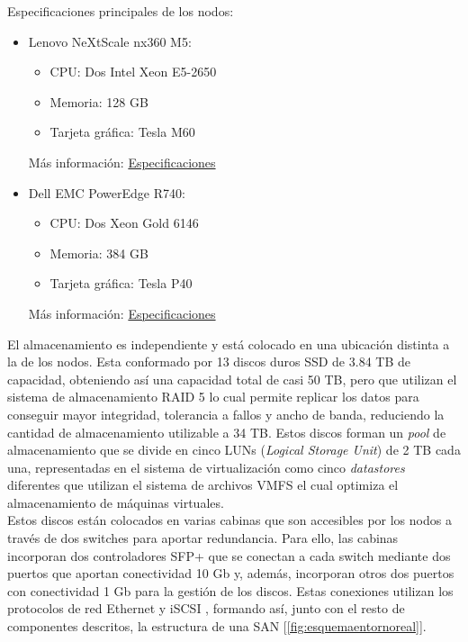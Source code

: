 Especificaciones principales de los nodos:
\begin{itemize}
    \item Lenovo NeXtScale nx360 M5: 
        \begin{itemize}
            \item CPU: Dos Intel Xeon E5-2650
            \item Memoria: 128 GB
            \item Tarjeta  gráfica: Tesla M60
        \end{itemize}
            Más información: \href{https://lenovopress.com/tips1195-nextscale-nx360-m5-e5-2600-v3}{Especificaciones}
    \item Dell EMC PowerEdge R740:
        \begin{itemize}
            \item CPU: Dos Xeon Gold 6146
            \item Memoria: 384 GB
            \item Tarjeta gráfica: Tesla P40
        \end{itemize}
    Más información: \href{https://www.dell.com/es-es/work/shop/servidores-almacenamiento-y-redes/smart-value-poweredge-r740-server-standard/spd/poweredge-r740/per7400m}{Especificaciones}
\end{itemize}
El almacenamiento es independiente y está colocado en una ubicación distinta a la de los nodos. Esta conformado por 13 discos duros SSD de 3.84 TB de capacidad, obteniendo así una capacidad total de casi 50 TB, pero que utilizan el sistema de almacenamiento RAID 5 lo cual permite replicar los datos para conseguir mayor  integridad, tolerancia a fallos y ancho de banda, reduciendo la cantidad de almacenamiento utilizable a 34 TB. Estos discos forman un \textit{pool} de almacenamiento que se divide en cinco LUNs (\textit{Logical Storage Unit}) de 2 TB cada una, representadas en el sistema de virtualización como cinco \textit{datastores} diferentes que utilizan el sistema de archivos VMFS el cual optimiza el almacenamiento de máquinas virtuales.\\
Estos discos están colocados en varias cabinas que son accesibles por los nodos a través de dos switches para aportar redundancia. Para ello, las cabinas incorporan dos controladores SFP+ que se conectan a cada switch mediante dos puertos que aportan conectividad 10 Gb y, además, incorporan otros dos puertos con conectividad 1 Gb para la gestión de los discos. Estas conexiones utilizan los protocolos de red Ethernet y iSCSI , formando así, junto con el resto de componentes descritos, la estructura de una SAN [\ref{fig:esquemaentornoreal}].\\


